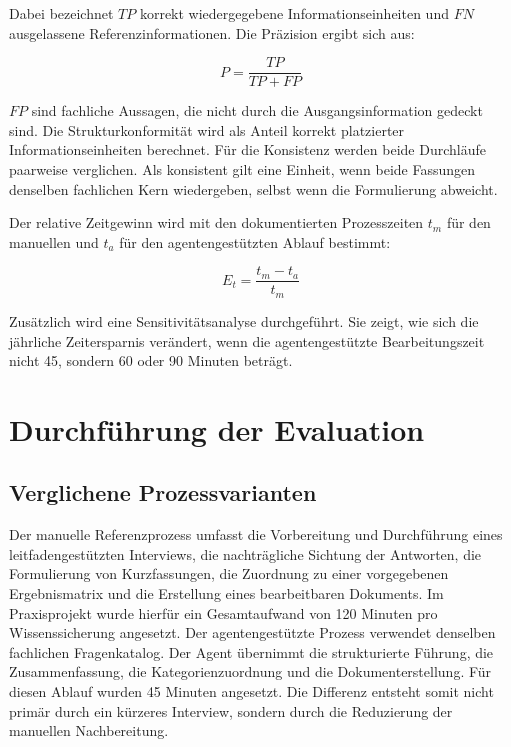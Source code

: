 \documentclass[
  10pt,
  ngerman,
  a4paper,
  toc=graduated,
  numbers=noenddot,
  headings=standardclasses,
  nonumberlist
]{scrartcl}
\begin{document}
Dabei bezeichnet $TP$ korrekt wiedergegebene Informationseinheiten und $FN$ ausgelassene Referenzinformationen. Die Präzision ergibt sich aus:

\begin{equation}
P = \frac{TP}{TP + FP}
\end{equation}

$FP$ sind fachliche Aussagen, die nicht durch die Ausgangsinformation gedeckt sind. Die Strukturkonformität wird als Anteil korrekt platzierter Informationseinheiten berechnet. Für die Konsistenz werden beide Durchläufe paarweise verglichen. Als konsistent gilt eine Einheit, wenn beide Fassungen denselben fachlichen Kern wiedergeben, selbst wenn die Formulierung abweicht.

Der relative Zeitgewinn wird mit den dokumentierten Prozesszeiten $t_m$ für den manuellen und $t_a$ für den agentengestützten Ablauf bestimmt:

\begin{equation}
E_t = \frac{t_m - t_a}{t_m}
\end{equation}

Zusätzlich wird eine Sensitivitätsanalyse durchgeführt. Sie zeigt, wie sich die jährliche Zeitersparnis verändert, wenn die agentengestützte Bearbeitungszeit nicht 45, sondern 60 oder 90 Minuten beträgt.

\section{Durchführung der Evaluation}

\subsection{Verglichene Prozessvarianten}

Der manuelle Referenzprozess umfasst die Vorbereitung und Durchführung eines leitfadengestützten Interviews, die nachträgliche Sichtung der Antworten, die Formulierung von Kurzfassungen, die Zuordnung zu einer vorgegebenen Ergebnismatrix und die Erstellung eines bearbeitbaren Dokuments. Im Praxisprojekt wurde hierfür ein Gesamtaufwand von 120 Minuten pro Wissenssicherung angesetzt. Der agentengestützte Prozess verwendet denselben fachlichen Fragenkatalog. Der Agent übernimmt die strukturierte Führung, die Zusammenfassung, die Kategorienzuordnung und die Dokumenterstellung. Für diesen Ablauf wurden 45 Minuten angesetzt. Die Differenz entsteht somit nicht primär durch ein kürzeres Interview, sondern durch die Reduzierung der manuellen Nachbereitung.
\end{document}
